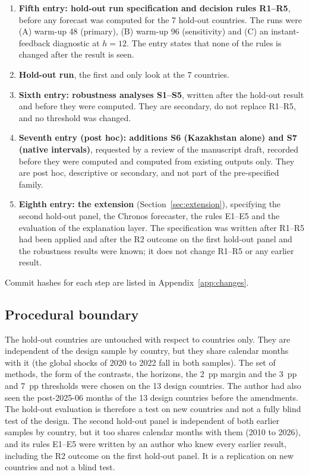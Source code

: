 \begin{enumerate}
\item \textbf{Fifth entry: hold-out run specification and decision rules R1--R5}, before any forecast was computed for the 7 hold-out countries. The runs were (A) warm-up 48 (primary), (B) warm-up 96 (sensitivity) and (C) an instant-feedback diagnostic at $h=12$. The entry states that none of the rules is changed after the result is seen.
\item \textbf{Hold-out run}, the first and only look at the 7 countries.
\item \textbf{Sixth entry: robustness analyses S1--S5}, written after the hold-out result and before they were computed. They are secondary, do not replace R1--R5, and no threshold was changed.
\item \textbf{Seventh entry (post hoc): additions S6 (Kazakhstan alone) and S7 (native intervals)}, requested by a review of the manuscript draft, recorded before they were computed and computed from existing outputs only. They are post hoc, descriptive or secondary, and not part of the pre-specified family.
\item \textbf{Eighth entry: the extension} (Section~\ref{sec:extension}), specifying the second hold-out panel, the Chronos forecaster, the rules E1--E5 and the evaluation of the explanation layer. The specification was written after R1--R5 had been applied and after the R2 outcome on the first hold-out panel and the robustness results were known; it does not change R1--R5 or any earlier result.
\end{enumerate}
Commit hashes for each step are listed in Appendix~\ref{app:changes}.

\subsection{Procedural boundary}\label{sec:boundary}

The hold-out countries are untouched with respect to countries only. They are independent of the design sample by country, but they share calendar months with it (the global shocks of 2020 to 2022 fall in both samples). The set of methods, the form of the contrasts, the horizons, the 2~pp margin and the 3~pp and 7~pp thresholds were chosen on the 13 design countries. The author had also seen the post-2025-06 months of the 13 design countries before the amendments. The hold-out evaluation is therefore a test on new countries and not a fully blind test of the design. The second hold-out panel is independent of both earlier samples by country, but it too shares calendar months with them (2010 to 2026), and its rules E1--E5 were written by an author who knew every earlier result, including the R2 outcome on the first hold-out panel. It is a replication on new countries and not a blind test.

